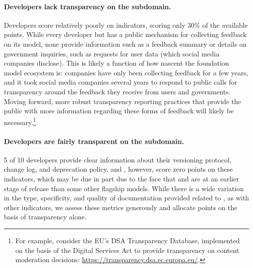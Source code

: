 \documentclass[screen, authorversion, acmsmall]{acmart}
\begin{document}
\paragraph{Developers lack transparency on the \feedback subdomain.} 
Developers score relatively poorly on \feedback indicators, scoring only 30\% of the available points. 
While every developer but \amazon has a public mechanism for collecting feedback on its model, none provide information such as a feedback summary or details on government inquiries, such as requests for user data (which social media companies disclose).
This is likely a function of how nascent the foundation model ecosystem is: companies have only been collecting feedback for a few years, and it took social media companies several years to respond to public calls for transparency around the feedback they receive from users and governments.
Moving forward, more robust transparency reporting practices that provide the public with more information regarding these forms of feedback will likely be necessary.\footnote{For example, consider the EU's DSA Transparency Database, implemented on the basis of the Digital Services Act to provide transparency on content moderation decisions: \url{https://transparency.dsa.ec.europa.eu/}.}

\paragraph{Developers are fairly transparent on the \updates subdomain.}
5 of 10 developers provide clear information about their versioning protocol, change log, and deprecation policy.
\inflection and \amazon, however, score zero points on these indicators, which may be due in part due to the face that \inflectionone and \titan are at an earlier stage of release than some other flagship models. 
While there is a wide variation in the type, specificity, and quality of documentation provided related to \updates, as with other indicators, we assess these metrics generously and allocate points on the basis of transparency alone. 
\end{document}
